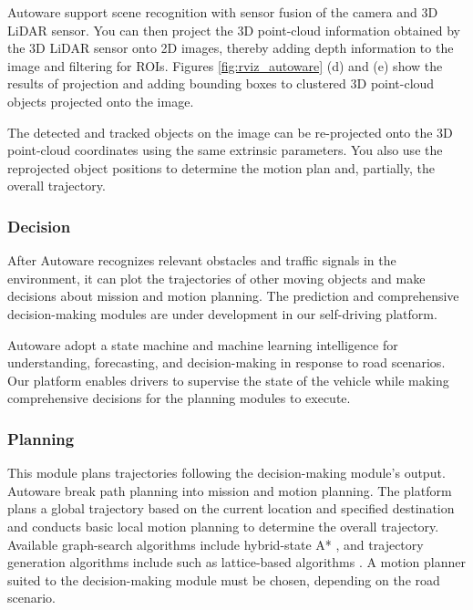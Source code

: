 Autoware support scene recognition with sensor fusion of the camera and 3D LiDAR sensor.
You can then project the 3D point-cloud information obtained by the 3D LiDAR sensor onto 2D images, thereby adding depth information to the image and filtering for ROIs.
Figures \ref{fig:rviz_autoware} (d) and (e) show the results of projection and adding bounding boxes to clustered 3D point-cloud objects projected onto the image.

The detected and tracked objects on the image can be re-projected onto the 3D point-cloud coordinates using the same extrinsic parameters.
You also use the reprojected object positions to determine the motion plan and, partially, the overall trajectory.

\subsubsection{Decision}
\label{sec:decision}

After Autoware recognizes relevant obstacles and traffic signals in the environment, it can plot the trajectories of other moving objects and make decisions about mission and motion planning.
The prediction and comprehensive decision-making modules are under development in our self-driving platform.

Autoware adopt a state machine and machine learning intelligence for understanding, forecasting, and decision-making in response to road scenarios.
Our platform enables drivers to supervise the state of the vehicle while making comprehensive decisions for the planning modules to execute.

\subsubsection{Planning}
This module plans trajectories following the decision-making module's output.
Autoware break path planning into mission and motion planning.
The platform plans a global trajectory based on the current location and specified destination and conducts basic local motion planning to determine the overall trajectory.
Available graph-search algorithms include hybrid-state A* \cite{dolgov2010path}, and trajectory generation algorithms include \cite{nagy2001trajectory} such as lattice-based algorithms \cite{darweesh2017open}.
A motion planner suited to the decision-making module must be chosen, depending on the road scenario.

